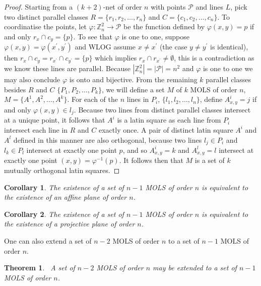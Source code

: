 \documentclass{article}
\newtheorem{theorem}{Theorem}
\newtheorem{corollary}{Corollary}
\begin{document}
\begin{proof}
  Starting from a \((k + 2)\)-net of order \(n\) with points \(\mathcal{P}\) and lines \(L\), pick two distinct parallel
classes \(R = \{r_{1}, r_{2}, \ldots, r_{n}\}\) and
\(C = \{c_{1}, c_{2}, \ldots, c_{n}\}\). To coordinatise the points, let \(\varphi : \mathbb{Z}_{n}^{2} \to \mathcal{P}\) be the function defined by
\(\varphi(x, y) = p\) if and only \(r_{x} \cap c_{y} = \{p\}\). To see that \(\varphi\) is one
to one, suppose \(\varphi(x, y) = \varphi(x^{\prime}, y^{\prime})\) and WLOG assume \(x \neq x^{\prime}\) (the
case \(y \neq y^{\prime}\) is identical), then
\(r_{x} \cap c_{y} = r_{x^{\prime}} \cap c_{y^{\prime}} = \{p\}\) which implies
\(r_{x} \cap r_{x^{\prime}} \neq \emptyset\), this is a contradiction as we know these lines are
parallel. Because \(|\mathbb{Z}_{n}^{2}| = |\mathcal{P}| = n^{2}\) and \(\varphi\) is one to one
we may also conclude \(\varphi\) is onto and bijective. From the remaining \(k\) parallel classes besides \(R\) and \(C\)
\(\{P_{1}, P_{2}, \ldots, P_{k}\}\), we will define a set \(M\) of \(k\) MOLS of order
\(n\), \(M = \{A^{1}, A^{2}, \ldots, A^{k}\}\). For each of the \(n\) lines in
\(P_{i}\), \(\{l_{1}, l_{2}, \ldots, l_{n}\}\), define \(A^{i}_{x,y} = j\) if and only
\(\varphi(x, y) \in l_{j}\). Because two lines from distinct parallel classes intersect
at a unique point, it follows that \(A^{i}\) is a latin square as each line from
\(P_{i}\) intersect each line in \(R\) and \(C\) exactly once. A pair of distinct latin square \(A^{i}\) and \(A^{l}\) defined in this manner are also orthogonal, because two lines \(l_{j} \in P_{i}\) and \(l_{k} \in P_{l}\) intersect at exactly one point \(p\), and so \(A^{i}_{x, y} = k\) and \(A^{l}_{x, y} = l\) intersect at exactly one point \((x, y) = \varphi^{-1}(p)\).
It follows then that \(M\) is a set of \(k\) mutually orthogonal latin squares.
\end{proof}
\begin{corollary}
  The existence of a set of \(n - 1\) MOLS of order \(n\) is equivalent to the existence of an affine plane of order \(n\).
\end{corollary}
\begin{corollary}\label{cor:proj-MOLS}
  The existence of a set of \(n - 1\) MOLS of order \(n\) is equivalent to the existence of a projective plane of order \(n\).
\end{corollary}

One can also extend a set of \(n - 2\) MOLS of order \(n\) to a set of \(n - 1\) MOLS of order \(n\).

\begin{theorem}~\label{thm:mols-extension}
  A set of \(n - 2\) MOLS of order \(n\) may be extended to a set of \(n - 1\) MOLS of order \(n\).
\end{theorem}
\end{document}
